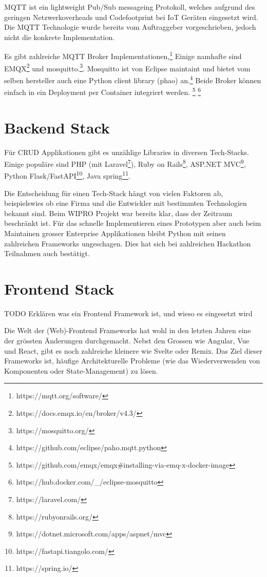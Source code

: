 \ac{MQTT} ist ein lightweight Pub/Sub messageing Protokoll, welches aufgrund des
geringen Netzwerkoverheads und Codefootprint bei \ac{IoT} Geräten eingesetzt wird.\cite{mqtt}
Die \ac{MQTT} Technologie wurde bereits vom Auftraggeber vorgeschrieben, jedoch
nicht die konkrete Implementation.

Es gibt zahlreiche \ac{MQTT} Broker Implementationen,\footnote{https://mqtt.org/software/}
Einige namhafte sind EMQX\footnote{https://docs.emqx.io/en/broker/v4.3/} und mosquitto.\footnote{https://mosquitto.org/}.
Mosquitto ist von Eclipse maintaint und bietet vom selben hersteller auch eine
Python client library (phao) an.\footnote{https://github.com/eclipse/paho.mqtt.python}
Beide Broker können einfach in ein Deployment per Container integriert werden.
\footnote{https://github.com/emqx/emqx\#installing-via-emq-x-docker-image} \footnote{https://hub.docker.com/\_/eclipse-mosquitto}

\section{Backend Stack}
\label{state:backend}

Für \ac{CRUD} Applikationen gibt es unzählige Libraries in diversen Tech-Stacks.
Einige populäre sind PHP (mit Laravel\footnote{https://laravel.com/}),
Ruby on Rails\footnote{https://rubyonrails.org/}, ASP.NET MVC\footnote{https://dotnet.microsoft.com/apps/aspnet/mvc},
Python Flask/FastAPI\footnote{https://fastapi.tiangolo.com/}, Java spring\footnote{https://spring.io/}.

Die Entscheidung für einen Tech-Stack hängt von vielen Faktoren ab, beispielswies
ob eine Firma und die Entwickler mit bestimmten Technologien bekannt sind.
Beim WIPRO Projekt war bereits klar, dass der Zeitraum beschränkt ist.
Für das schnelle Implementieren eines Prototypen aber auch beim Maintainen
grosser Enterprise Applikationen bleibt Python mit seinen zahlreichen
Frameworks ungeschagen. Dies hat sich bei zahlreichen Hackathon Teilnahmen
auch bestätigt.

\section{Frontend Stack}
\label{state:frontend}

TODO Erklären was ein Frontend Framework ist, und wieso es eingesetzt wird

Die Welt der (Web)-Frontend Frameworks hat wohl in den letzten Jahren eine der grössten Änderungen
durchgemacht. Nebst den Grossen wie Angular, Vue und React, gibt es noch zahlreiche kleinere wie Svelte oder
Remix. Das Ziel dieser Frameworks ist, häufige Architekturelle Probleme (wie das Wiederverwenden von Komponenten
oder State-Management) zu lösen.\cite{do-i-need-a-frontend-fwk}

